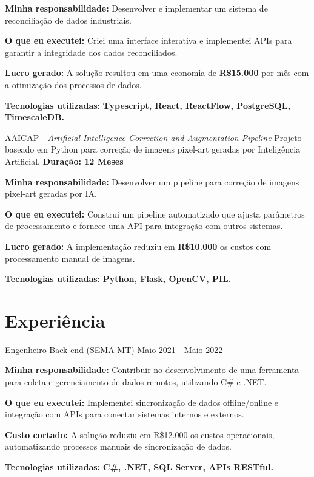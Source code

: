 \resumeItemListStart
\item \textbf{Minha responsabilidade:} Desenvolver e implementar um sistema de reconciliação de dados industriais.
\item \textbf{O que eu executei:} Criei uma interface interativa e implementei APIs para garantir a integridade dos dados reconciliados.
\item \textbf{Lucro gerado:} A solução resultou em uma economia de \textbf{R\$15.000} por mês com a otimização dos processos de dados.
\item \textbf{Tecnologias utilizadas:} \textbf{Typescript, React, ReactFlow, PostgreSQL, TimescaleDB.}
\resumeItemListEnd

\vspace{-2mm}

\resumeProject
{ AAICAP - \textit{Artificial Intelligence Correction and Augmentation Pipeline}}
{Projeto baseado em Python para correção de imagens pixel-art geradas por Inteligência Artificial.}
{\textbf{Duração: 12 Meses}}

\resumeItemListStart
\item \textbf{Minha responsabilidade:} Desenvolver um pipeline para correção de imagens pixel-art geradas por IA.
\item \textbf{O que eu executei:} Construi um pipeline automatizado que ajusta parâmetros de processamento e fornece uma API para integração com outros sistemas.
\item \textbf{Lucro gerado:} A implementação reduziu em \textbf{R\$10.000} os custos com processamento manual de imagens.
\item \textbf{Tecnologias utilizadas:} \textbf{Python, Flask, OpenCV, PIL.}
\resumeItemListEnd

\resumeSubHeadingListEnd
\vspace{-8.5mm}

\section{\textbf{Experiência}}
\resumeSubHeadingListStart
\resumeSubheading
{ Engenheiro Back-end (SEMA-MT)}{}
{}{Maio 2021 - Maio 2022}
\vspace{-2.0mm}
\resumeItemListStart
\item \textbf{Minha responsabilidade:} Contribuir no desenvolvimento de uma ferramenta para coleta e gerenciamento de dados remotos, utilizando C\# e .NET.
\item \textbf{O que eu executei:} Implementei sincronização de dados offline/online e integração com APIs para conectar sistemas internos e externos.
\item \textbf{Custo cortado:} A solução reduziu em R\$12.000 os custos operacionais, automatizando processos manuais de sincronização de dados.
\item \textbf{Tecnologias utilizadas:} \textbf{C\#, .NET, SQL Server, APIs RESTful.}
\resumeItemListEnd

